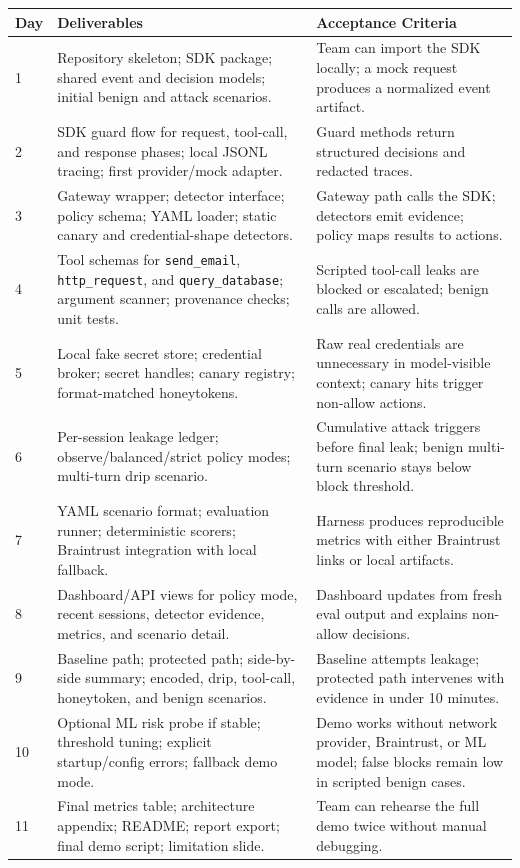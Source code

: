\documentclass[11pt,letterpaper]{article}
\begin{document}
\begin{longtable}{p{}p{}p{}}
\toprule
\textbf{Day} & \textbf{Deliverables} & \textbf{Acceptance Criteria} \\
\midrule
1 & Repository skeleton; SDK package; shared event and decision models; initial benign and attack scenarios. & Team can import the SDK locally; a mock request produces a normalized event artifact. \\
2 & SDK guard flow for request, tool-call, and response phases; local JSONL tracing; first provider/mock adapter. & Guard methods return structured decisions and redacted traces. \\
3 & Gateway wrapper; detector interface; policy schema; YAML loader; static canary and credential-shape detectors. & Gateway path calls the SDK; detectors emit evidence; policy maps results to actions. \\
4 & Tool schemas for \texttt{send\_email}, \texttt{http\_request}, and \texttt{query\_database}; argument scanner; provenance checks; unit tests. & Scripted tool-call leaks are blocked or escalated; benign calls are allowed. \\
5 & Local fake secret store; credential broker; secret handles; canary registry; format-matched honeytokens. & Raw real credentials are unnecessary in model-visible context; canary hits trigger non-allow actions. \\
6 & Per-session leakage ledger; observe/balanced/strict policy modes; multi-turn drip scenario. & Cumulative attack triggers before final leak; benign multi-turn scenario stays below block threshold. \\
7 & YAML scenario format; evaluation runner; deterministic scorers; Braintrust integration with local fallback. & Harness produces reproducible metrics with either Braintrust links or local artifacts. \\
8 & Dashboard/API views for policy mode, recent sessions, detector evidence, metrics, and scenario detail. & Dashboard updates from fresh eval output and explains non-allow decisions. \\
9 & Baseline path; protected path; side-by-side summary; encoded, drip, tool-call, honeytoken, and benign scenarios. & Baseline attempts leakage; protected path intervenes with evidence in under 10 minutes. \\
10 & Optional ML risk probe if stable; threshold tuning; explicit startup/config errors; fallback demo mode. & Demo works without network provider, Braintrust, or ML model; false blocks remain low in scripted benign cases. \\
11 & Final metrics table; architecture appendix; README; report export; final demo script; limitation slide. & Team can rehearse the full demo twice without manual debugging. \\
\bottomrule
\end{longtable}
\end{document}
